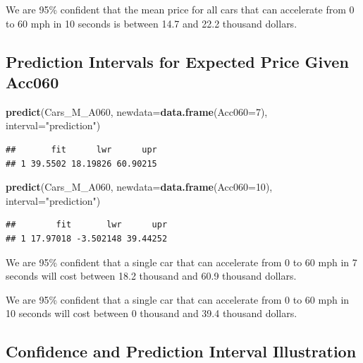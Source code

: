 \documentclass[]{book}
\newenvironment{Shaded}{\begin{snugshade}}{\end{snugshade}}
\newcommand{\KeywordTok}[1]{\textcolor[rgb]{0.13,0.29,0.53}{\textbf{#1}}}
\newcommand{\DataTypeTok}[1]{\textcolor[rgb]{0.13,0.29,0.53}{#1}}
\newcommand{\DecValTok}[1]{\textcolor[rgb]{0.00,0.00,0.81}{#1}}
\newcommand{\StringTok}[1]{\textcolor[rgb]{0.31,0.60,0.02}{#1}}
\newcommand{\NormalTok}[1]{#1}
\begin{document}
We are 95\% confident that the mean price for all cars that can
accelerate from 0 to 60 mph in 10 seconds is between 14.7 and 22.2
thousand dollars.

\subsection{Prediction Intervals for Expected Price Given
Acc060}\label{prediction-intervals-for-expected-price-given-acc060}

\begin{Shaded}
\begin{Highlighting}[]
\KeywordTok{predict}\NormalTok{(Cars_M_A060, }\DataTypeTok{newdata=}\KeywordTok{data.frame}\NormalTok{(}\DataTypeTok{Acc060=}\DecValTok{7}\NormalTok{), }\DataTypeTok{interval=}\StringTok{"prediction"}\NormalTok{)}
\end{Highlighting}
\end{Shaded}

\begin{verbatim}
##       fit      lwr      upr
## 1 39.5502 18.19826 60.90215
\end{verbatim}

\begin{Shaded}
\begin{Highlighting}[]
\KeywordTok{predict}\NormalTok{(Cars_M_A060, }\DataTypeTok{newdata=}\KeywordTok{data.frame}\NormalTok{(}\DataTypeTok{Acc060=}\DecValTok{10}\NormalTok{), }\DataTypeTok{interval=}\StringTok{"prediction"}\NormalTok{)}
\end{Highlighting}
\end{Shaded}

\begin{verbatim}
##        fit       lwr      upr
## 1 17.97018 -3.502148 39.44252
\end{verbatim}

We are 95\% confident that a single car that can accelerate from 0 to 60
mph in 7 seconds will cost between 18.2 thousand and 60.9 thousand
dollars.

We are 95\% confident that a single car that can accelerate from 0 to 60
mph in 10 seconds will cost between 0 thousand and 39.4 thousand
dollars.

\subsection{Confidence and Prediction Interval
Illustration}\label{confidence-and-prediction-interval-illustration}
\end{document}
